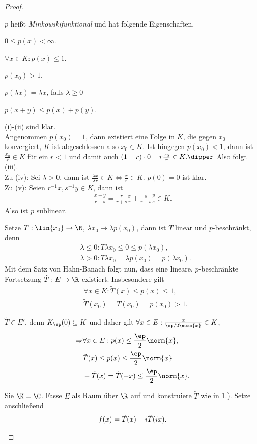 \begin{proof}
\begin{proofenum}
\begin{defnenum}
$p$ heißt \emph{Minkowskifunktional} und hat folgende Eigenschaften,
\begin{equivenum}
  \item $0\le p(x) <\infty$.
  \item $\forall x\in K : p(x) \le 1$.
  \item $p(x_0) > 1$.
  \item $p(\lambda x)=\lambda x$, falls $\lambda \ge 0$
  \item $p(x+y) \le p(x) + p(y)$.
\end{equivenum}
(i)-(ii) sind klar.\\
Angenommen $p(x_0)=1$, dann existiert eine Folge in $K$,
die gegen $x_0$ konvergiert, $K$ ist abgeschlossen also $x_0\in K$. \dipper
Ist hingegen $p(x_0)<1$, dann ist $\frac{x_0}{r}\in K$ für ein $r < 1$ und
damit auch $(1-r)\cdot 0  + r \frac{x_0}{r}\in K.\dipper$ Also folgt (iii).\\
Zu (iv): Sei $\lambda > 0$, dann ist $\frac{\lambda x}{\lambda r}\in
K\Leftrightarrow \frac{x}{r}\in K$. $p(0)=0$ ist klar.\\
Zu (v): Seien $r^{-1}x,s^{-1}y\in K$, dann ist
\begin{align*}
\frac{x+y}{r+s} = \frac{r}{r+s}\frac{x}{r} + \frac{s}{r+s}\frac{y}{s}\in K.
\end{align*}
Also ist $p$ sublinear.
\item Setze $T: \lin{x_0}\to \R$, $\lambda x_0\mapsto \lambda p(x_0)$, dann ist
$T$ linear und $p$-beschränkt, denn
\begin{align*}
&\lambda \le 0 : T\lambda x_0 \le 0 \le p(\lambda x_0),\\
&\lambda > 0 : T\lambda x_0 = \lambda p(x_0) = p(\lambda x_0).
\end{align*}
Mit dem Satz von Hahn-Banach folgt nun, dass eine lineare, $p$-beschränkte
Fortsetzung $\tilde{T}: E\to \R$ existiert. Insbesondere gilt
\begin{align*}
&\forall x\in K : \tilde{T}(x) \le p(x) \le 1,\\
&\tilde{T}(x_0) = T(x_0) = p(x_0) > 1.
\end{align*}
\item $\tilde{T}\in E'$, denn $K_\ep(0)\subseteq K$ und daher gilt $\forall
x\in E: \frac{x}{\ep/2 \norm{x}}\in K$,
\begin{align*}
\Rightarrow &\forall x\in E : p(x) \le \frac{\ep}{2}\norm{x},\\
& \tilde{T}(x) \le p(x)  \le \frac{\ep}{2}\norm{x}\\
& -\tilde{T}(x) = \tilde{T}(-x) \le \frac{\ep}{2}\norm{x}.
 \end{align*}
\end{defnenum}
\item Sie $\K=\C$. Fasse $E$ als Raum über $\R$ auf und konstruiere $\tilde{T}$
wie in 1.). Setze anschließend
\begin{align*}
f(x) = \tilde{T}(x)-i\tilde{T}(ix).\qedhere
\end{align*}
\end{proofenum}
\end{proof}

